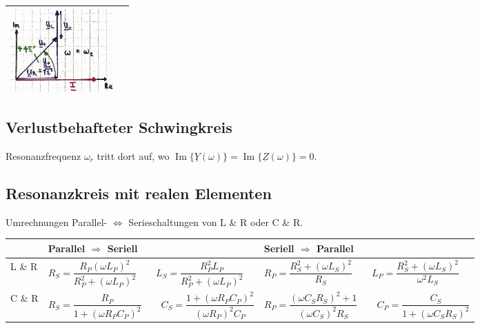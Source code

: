 \begin{tabular}{| p{4cm} | p{14.4cm}|}
\begin{minipage}{4.6cm}
    \end{minipage}
	\vline \hspace{0.1cm}
	\begin{minipage}{4.6cm}
 		\includegraphics[width=4cm]{./bilder/Zeigerdiagramm_w2.jpg}   
    \end{minipage}\\
	\hline
\end{tabular}
\renewcommand{\arraystretch}{1}

\subsection{Verlustbehafteter Schwingkreis}
Resonanzfrequenz $\omega_r$ tritt dort auf, wo 
$\operatorname{Im} \{ \underline{Y}(\omega) \} =
\operatorname{Im}\{\underline{Z}(\omega) \} = 0$.

\subsection{Resonanzkreis mit realen Elementen}
Umrechnungen Parallel- $\Longleftrightarrow$ Serieschaltungen von L \& R oder C \& R. \\

\renewcommand{\arraystretch}{1.1}
\begin{tabular}{| p{2cm} | p{8cm} | p{8cm} |}
	\hline
		& \textbf{Parallel $\Rightarrow$ Seriell}  
		& \textbf{Seriell $\Rightarrow$ Parallel} \\
	\hline
		L \& R
		& $ R_S = \dfrac{R_P (\omega L_P)^2}{R_P^2 + (\omega L_P)^2} \qquad 
			L_S = \dfrac{R_P^2 L_P}{R_P^2 + (\omega L_P)^2}  $
		& $ R_P = \dfrac{R_S^2 + (\omega L_S)^2}{R_S} \qquad 
			L_P = \dfrac{R_S^2 + (\omega L_S)^2}{\omega^2 L_S}   $ \\
	\hline	
		C \& R
		& $ R_S = \dfrac{R_P}{1 + (\omega R_P C_P)^2} \qquad 
			C_S = \dfrac{1 + (\omega R_P C_P)^2}{(\omega R_P)^2 C_P}$
		& $ R_P = \dfrac{(\omega C_S R_S)^2 + 1}{(\omega C_S)^2 R_S} \qquad
			C_P = \dfrac{C_S}{1 + (\omega C_S R_S)^2}$\\
	\hline
\end{tabular}
\renewcommand{\arraystretch}{1}
